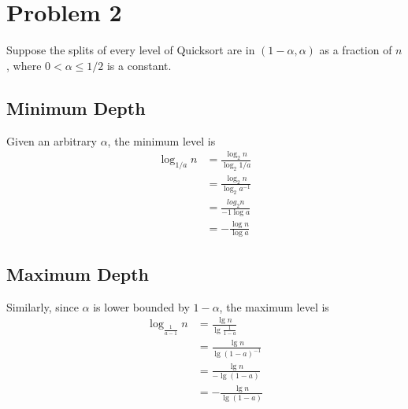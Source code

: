 \documentclass{article}
\begin{document}
\section*{Problem 2}
Suppose the splits of every level of Quicksort are in \((1 - \alpha, \alpha)\) as a fraction of \(n\), where \(0 < \alpha \leq 1/2\) is a constant.

\subsection*{Minimum Depth}
Given an arbitrary \(\alpha\), the minimum level is
\begin{align*}
      \log_{1/a}n & = \frac{\log_2n}{\log_2 1/a}     \\
                  & = \frac{\log_2 n}{\log_2 a^{-1}} \\
                  & = \frac{log_2 n}{-1 \log a}      \\
                  & = -\frac{\log n}{\log a}
\end{align*}

\subsection*{Maximum Depth}
Similarly, since \(\alpha\) is lower bounded by \(1 - \alpha\), the maximum level is
\begin{align*}
      \log_\frac{1}{a - 1} n & = \frac{\lg n}{\lg \frac{1}{1-a}} \\
                             & = \frac{\lg n}{\lg(1-a) ^ {-1}}   \\
                             & = \frac{\lg n}{-\lg(1-a)}         \\
                             & = -\frac{\lg n}{\lg(1-a)}
\end{align*}
\end{document}
